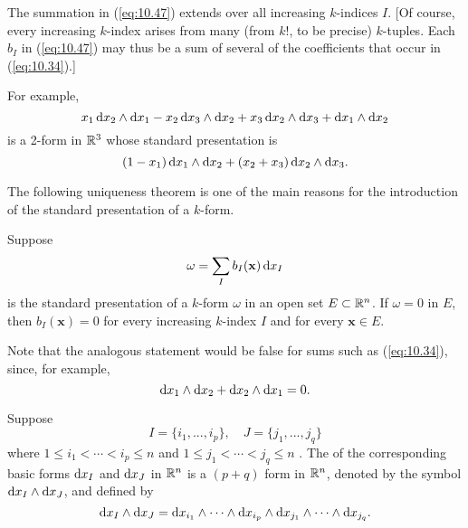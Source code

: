 The summation in (\ref{eq:10.47}) extends over all increasing $k$-indices $I$.
    [Of course, every increasing $k$-index arises from many (from $k!$, to be precise) $k$-tuples.
        Each $b_I$ in (\ref{eq:10.47})
        may thus be a sum of several of the coefficients that occur in (\ref{eq:10.34}).]

For example,
\begin{equation*}
    x_1 \d x_2 \wedge \d x_1 -
    x_2 \d x_3 \wedge \d x_2 +
    x_3 \d x_2 \wedge \d x_3 +
    \d x_1 \wedge \d x_2
\end{equation*}
is a 2-form in ${\protect\mathbb R}^3$ whose standard presentation is
\begin{equation*}
    (1-x_1) \d x_1 \wedge \d x_2 +
    (x_2 + x_3) \d x_2 \wedge \d x_3 .
\end{equation*}

The following uniqueness theorem is one of the main reasons for the
introduction of the standard presentation of a $k$-form.

\begin{thm}
    \label{thm:10.15}
    Suppose
    \begin{equation}
        \label{eq:10.48}
        \omega = \sum_{I} b_I (\mathbf{x}) \d x_I
    \end{equation}
    is the standard presentation of a $k$-form $\omega$ in an open set $E \subset {\protect\mathbb R}^n$.
    If $\omega = 0$ in $E$,
    then $b_I(\mathbf{x}) = 0$ for every increasing $k$-index $I$ and for every $\mathbf{x} \in E$.
\end{thm}

Note that the analogous statement would be false for sums such as (\ref{eq:10.34}),
since, for example,
\begin{equation*}
    \d x_1 \wedge \d x_2 +
    \d x_2 \wedge \d x_1 = 0.
\end{equation*}


\begin{mydef}
    Suppose
    \begin{equation}
        \label{eq:10.51}
        I = \{i_1,...,i_p\},
        \quad
        J = \{j_1,...,j_q\}
    \end{equation}
    where $1 \leq i_1 < \cdots < i_p \leq n$
    and $1 \leq j_1 < \cdots < j_q \leq n$ .
    The  of the corresponding basic forms $\d x_I$ and $\d x_J$ in ${\protect\mathbb R}^n$ is a $(p + q)$ form in ${\protect\mathbb R}^n$, denoted by the symbol $\d x_I \wedge \d x_J$, and defined by
    \begin{equation}
        \label{eq:10.52}
        \d x_I \wedge \d x_J =
        \d x_{i_1} \wedge \cdots \wedge
        \d x_{i_p} \wedge
        \d x_{j_1} \wedge \cdots \wedge
        \d x_{j_q}.
    \end{equation}
\end{mydef}

